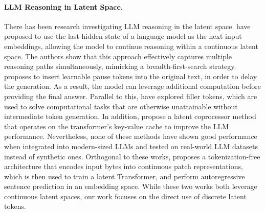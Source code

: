 \paragraph{LLM Reasoning in Latent Space.}
There has been research investigating LLM reasoning in the latent space. \citet{hao2024training} have proposed to use the last hidden state of a language model as the next input embeddings, allowing the model to continue reasoning within a continuous latent space. The authors show that this approach effectively captures multiple reasoning paths simultaneously, mimicking a breadth-first-search strategy. \citet{goyal2023think} proposes to insert learnable pause tokens into the original text, in order to delay the generation. As a result, the model can leverage additional computation before providing the final answer. Parallel to this, \citet{pfau2024let} have explored filler tokens, which are used to solve computational tasks that are otherwise unattainable without intermediate token generation. 
In addition, \citet{kvcache} propose a latent coprocessor method that operates on the transformer's key-value cache to improve the LLM performance.  
Nevertheless, none of these methods have shown good performance when integrated into modern-sized LLMs and tested on real-world LLM datasets instead of synthetic ones.
Orthogonal to these works, \citet{pagnoni2024bytelatenttransformerpatches} proposes a tokenization-free architecture that encodes input bytes into continuous patch representations, which is then used to train a latent Transformer, and \citet{barrault2024large} perform autoregressive sentence prediction in an embedding space. While these two works both leverage continuous latent spaces, our work focuses on the direct use of discrete latent tokens.